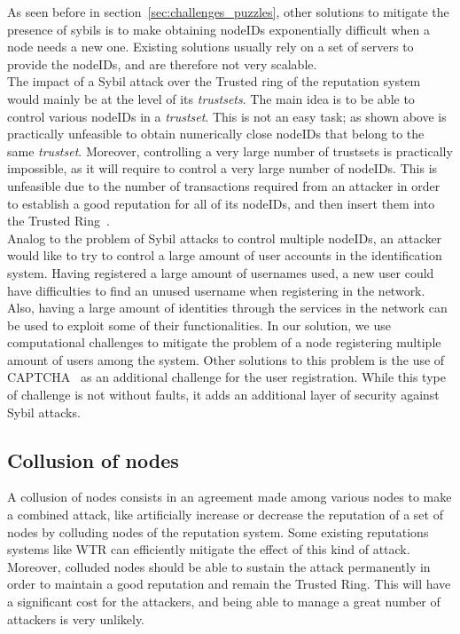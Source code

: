 As seen before in section~\ref{sec:challenges_puzzles}, other solutions to
mitigate the presence of sybils is to make obtaining nodeIDs
exponentially difficult when a node needs a new
one. Existing solutions usually
rely on a set of servers to provide the nodeIDs, and are therefore not very
scalable.\\

The impact of a Sybil attack over the Trusted ring of the reputation system
would mainly be at the level of its \textit{trustsets}. The main idea is to be
able to control various nodeIDs in a \textit{trustset}. This is not an easy
task; as shown above is practically unfeasible to obtain numerically close
nodeIDs that belong to the same \textit{trustset}. Moreover, controlling a very
large number of trustsets is practically impossible, as it will require to
control a very large number of nodeIDs. This is unfeasible due to the number of
transactions required from an attacker in order to establish a good reputation
for all of its nodeIDs, and then insert them into the Trusted
Ring~\cite{rosas2011corps}.\\

Analog to the problem of Sybil attacks to control multiple nodeIDs, an attacker
would like to try to control a large amount of user accounts in the
identification system. Having registered a large amount of usernames used, a new
user could have difficulties to find an unused username when registering in the
network. Also, having a large amount of identities through the services in the
network can be used to exploit some of their functionalities.
In our solution, we use computational challenges to mitigate the problem of a
node registering multiple amount of users among the system. Other solutions to
this problem is the use of CAPTCHA~\cite{von2003captcha} as an additional
challenge for the user registration. While this type of challenge is not
without faults, it adds an additional layer of security against Sybil attacks.


\subsection{Collusion of nodes}

A collusion of nodes consists in an agreement made among various nodes to make
a combined attack, like artificially increase or decrease the reputation of a
set of nodes by colluding nodes of the reputation system. Some existing
reputations systems like WTR can efficiently mitigate the effect of this kind
of attack. Moreover, colluded nodes should be able to sustain the attack
permanently in order to maintain a good reputation and remain the Trusted Ring.
This will have a significant cost for the attackers, and being able to manage a
great number of attackers is very unlikely. 

